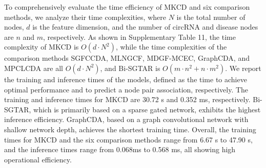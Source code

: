 \documentclass[journal,twoside,web]{ieeecolor}
\begin{document}
To comprehensively evaluate the time efficiency of MKCD and six comparison methods, we analyze their time complexities, where $N$ is the total number of nodes, $d$ is the feature dimension, and the number of circRNA and disease nodes are $n$ and $m$, respectively. As shown in Supplementary Table 11, the time complexity of MKCD is $O(d\cdot N^2)$, while the time complexities of the comparison methods SGFCCDA, MLNGCF, MDGF-MCEC, GraphCDA, and MPCLCDA are all $O(d\cdot N^2)$, and Bi-SGTAR is $O(m\cdot n^2+n\cdot m^2)$. We report the training and inference times of the models, defined as the time to achieve optimal performance and to predict a node pair association, respectively. The training and inference times for MKCD are 30.72 s and 0.352 ms, respectively. Bi-SGTAR, which is primarily based on a sparse gated network, exhibits the highest inference efficiency. GraphCDA, based on a graph convolutional network with shallow network depth, achieves the shortest training time. Overall, the training times for MKCD and the six comparison methods range from 6.67 s to 47.90 s, and the inference times range from 0.068ms to 0.568 ms, all showing high operational efficiency.%
\end{document}
